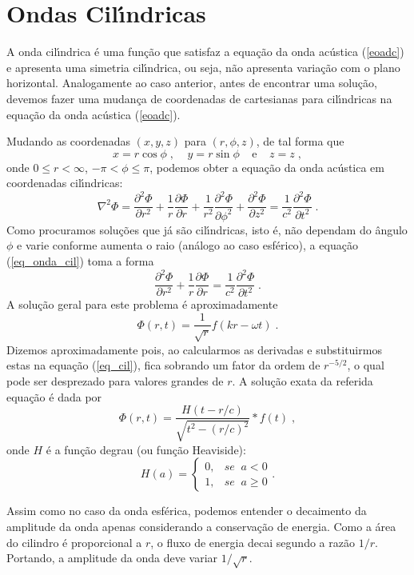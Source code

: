 \section{Ondas Cil\'{\i}ndricas}
\label{cil}

A onda cil\'{\i}ndrica \'e uma fun\c{c}\~ao que satisfaz a equa\c{c}\~ao
da onda ac\'ustica (\ref{eoadc}) e apresenta uma simetria
cil\'{\i}ndrica, ou seja, n\~ao apresenta varia\c{c}\~ao com o plano
horizontal. Analogamente ao caso anterior, antes de encontrar uma
solu\c{c}\~ao, devemos fazer uma mudan\c{c}a de coordenadas de
cartesianas para cil\'{\i}ndricas na equa\c{c}\~ao da onda ac\'ustica
(\ref{eoadc}).

Mudando as coordenadas $(x,y,z)$ para $(r,\phi,z)$, de tal forma
que
$$
x=r\cos{\phi}\;, \;\;\;\; y=r\sin{\phi} \;\;\;\;\mathrm{e}\;\;\;\; z=z \;,
$$
onde $0 \leq r <\infty $, $-\pi < \phi \leq \pi $, podemos obter a
equa\c{c}\~ao da onda ac\'ustica em coordenadas cil\'{\i}ndricas:
\begin{equation}
\nabla^2 \Phi = \frac{\partial^2 \Phi}{\partial r^2} +
\frac{1}r{}\frac{\partial \Phi}{\partial r} +
\frac{1}{r^2}\frac{\partial^2 \Phi}{\partial
\phi^2}+\frac{\partial^2 \Phi}{\partial z^2}=
\frac{1}{c^2}\frac{\partial^2 \Phi}{\partial t^2} \;.
\label{eq_onda_cil}
\end{equation}
Como procuramos solu\c{c}\~oes que j\'a s\~ao cil\'{\i}ndricas,
isto \'e, n\~ao dependam do \^angulo $\phi$ e varie conforme
aumenta o raio (an\'alogo ao caso esf\'erico), a equa\c{c}\~ao
(\ref{eq_onda_cil}) toma a forma
\begin{equation}
\frac{\partial^2 \Phi}{\partial r^2} + \frac{1}{r}\frac{\partial
\Phi}{\partial r} = \frac{1}{c^2}\frac{\partial^2 \Phi}{\partial
t^2} \;.
\label{eq_cil}
\end{equation}
A solu\c{c}\~ao geral para este problema \'e aproximadamente
\begin{equation}
\Phi(r,t) = \frac{1}{\sqrt{r}}f(kr-\omega t) \;.
\label{sol_cil_apr}
\end{equation}
Dizemos aproximadamente pois, ao calcularmos as derivadas e
substituirmos estas na equa\c{c}\~ao (\ref{eq_cil}), fica
sobrando um fator da ordem de $r^{-5/2}$, o qual pode ser
desprezado para valores grandes de $r$. A solu\c{c}\~ao exata da
referida equa\c{c}\~ao \'e dada por
\begin{equation}
\Phi(r,t) = \frac{H(t-r/c)}{\sqrt{t^2-(r/c)^2}}\ast f(t)\;,
\label{sol_cil_exata}
\end{equation}
onde $H$ \'e a fun\c{c}\~ao degrau (ou fun\c{c}\~ao Heaviside):
\begin{equation}
H(a)= \left \{
\begin{array}{ll}
0, & se  \; \; a < 0 \\
1, & se \; \;   a \geq 0
\end{array}  \right..
\label{heaviside}
\end{equation}

Assim como no caso da onda esf\'erica, podemos entender o
decaimento da amplitude da onda apenas considerando a
conserva\c{c}\~ao de energia. Como a \'area do cilindro \'e
proporcional a $r$, o fluxo de energia decai segundo a raz\~ao
$1/r$. Portando,  a amplitude da onda deve variar $1/\sqrt{r}$.
